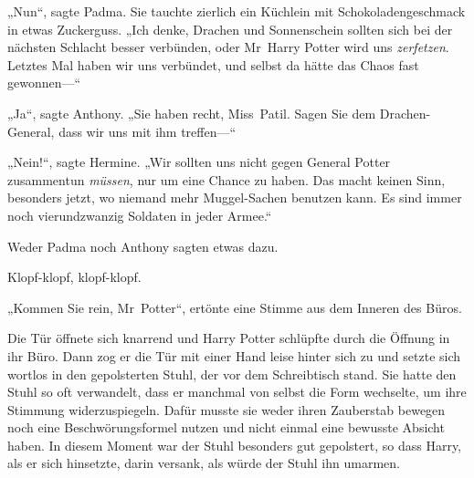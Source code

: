 „Nun“, sagte Padma. Sie tauchte zierlich ein Küchlein mit Schokoladengeschmack in etwas Zuckerguss. „Ich denke, Drachen und Sonnenschein sollten sich bei der nächsten Schlacht besser verbünden, oder Mr~Harry Potter wird uns \emph{zerfetzen}. Letztes Mal haben wir uns verbündet, und selbst da hätte das Chaos fast gewonnen—“

„Ja“, sagte Anthony. „Sie haben recht, Miss~Patil. Sagen Sie dem Drachen-General, dass wir uns mit ihm treffen—“

„Nein!“, sagte Hermine. „Wir sollten uns nicht gegen General Potter zusammentun \emph{müssen}, nur um eine Chance zu haben. Das macht keinen Sinn, besonders jetzt, wo niemand mehr Muggel-Sachen benutzen kann. Es sind immer noch vierundzwanzig Soldaten in jeder Armee.“

Weder Padma noch Anthony sagten etwas dazu.

\later

Klopf-klopf, klopf-klopf.

„Kommen Sie rein, Mr~Potter“, ertönte eine Stimme aus dem Inneren des Büros.

Die Tür öffnete sich knarrend und Harry Potter schlüpfte durch die Öffnung in ihr Büro. Dann zog er die Tür mit einer Hand leise hinter sich zu und setzte sich wortlos in den gepolsterten Stuhl, der vor dem Schreibtisch stand. Sie hatte den Stuhl so oft verwandelt, dass er manchmal von selbst die Form wechselte, um ihre Stimmung widerzuspiegeln. Dafür musste sie weder ihren Zauberstab bewegen noch eine Beschwörungsformel nutzen und nicht einmal eine bewusste Absicht haben.
In diesem Moment war der Stuhl besonders gut gepolstert, so dass Harry, als er sich hinsetzte, darin versank, als würde der Stuhl ihn umarmen.

